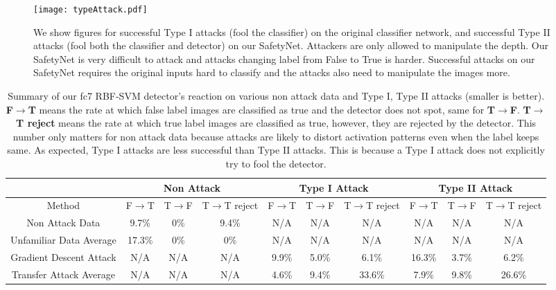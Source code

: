 \documentclass[10pt,twocolumn,letterpaper]{article}
\begin{document}
\begin{figure}[h]
\begin{center}
\resizebox{0.48\textwidth}{!}
{
\texttt{[image: typeAttack.pdf]}
}
\caption{We show figures for successful Type I attacks (fool the classifier) on the original classifier network, and successful Type II attacks (fool both
the classifier and detector) on our SafetyNet. Attackers are only allowed to manipulate the depth. Our SafetyNet is very difficult to attack and
 attacks changing label from False to True is harder. Successful attacks on our SafetyNet requires the original inputs hard to classify and the attacks
also need to manipulate the images more. }
\label{typeattack}
\end{center}
\vspace{-2ex}
\end{figure}

\begin{table*}[h!]
\begin{center}
\resizebox{0.9\textwidth}{!}
{
\begin{tabular}{  c | c | c | c | c | c | c | c | c | c}
 & \multicolumn{3}{c|}{Non Attack} & \multicolumn{3}{c|}{Type I Attack} & \multicolumn{3}{c}{Type II Attack} \\
  \hline
Method & F$\rightarrow$T & T$\rightarrow$F & T$\rightarrow$T reject & F$\rightarrow$T & T$\rightarrow$F & T$\rightarrow$T reject & F$\rightarrow$T & T$\rightarrow$F & T$\rightarrow$T reject \\
  \hline
Non Attack Data & 9.7\% & 0\% & 9.4\% & N/A & N/A & N/A & N/A & N/A & N/A\\
Unfamiliar Data Average & 17.3\% & 0\% & 0\% & N/A & N/A & N/A & N/A & N/A & N/A\\
Gradient Descent Attack & N/A & N/A & N/A & 9.9\% &  5.0\% & 6.1\% & 16.3\% & 3.7\% & 6.2\%\\
Transfer Attack Average & N/A & N/A & N/A &  4.6\% &  9.4\% & 33.6\% & 7.9\% &  9.8\% & 26.6\% \\
\end{tabular}
}
\vspace{-2ex}
\caption{Summary of our fc7 RBF-SVM detector's reaction on various non attack data and Type I, Type II attacks (smaller is better). 
\textbf{F$\rightarrow$T} means the rate at which false label images are classified as true and the detector does not spot, same for \textbf{T$\rightarrow$F}. 
\textbf{T$\rightarrow$T reject} means the rate at which true label images are classified as true, however,
they are rejected by the detector. This number only matters for non attack data because attacks are likely to distort activation patterns
even when the label keeps same. As expected, Type I attacks are less successful than Type II attacks. This is because a Type I attack does not explicitly
try to fool the detector. }
\label{tb:summary}
\end{center}
\end{table*}
\end{document}
